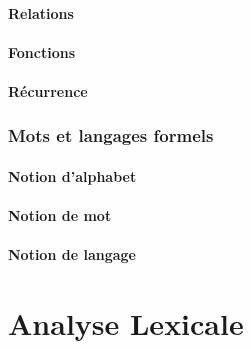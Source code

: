 \subsection{Relations}







\subsection{Fonctions}


 
\subsection{Récurrence}



\section{Mots et langages formels}
 
\subsection{Notion d'alphabet}

 
\subsection{Notion de mot}






 
\subsection{Notion de langage}





\part{Analyse Lexicale}
 
